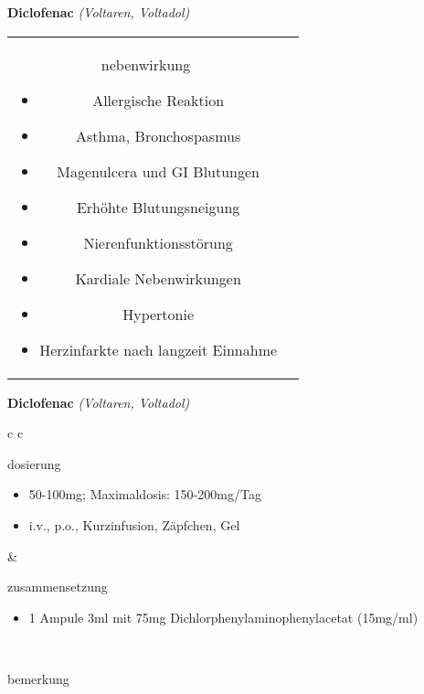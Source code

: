 \begin{frame}{
    \textbf{Diclofenac}
    \textit{(Voltaren, Voltadol)}
}
\begin{tabular}{c c}
\begin{beamercolorbox}[wd=\boxwidth\textwidth,ht=\boxheight\textheight,sep=1em]{nebenwirkung}
            \scriptsize
            \begin{itemize}
                \item Allergische Reaktion
                \item Asthma, Bronchospasmus
                \item Magenulcera und GI Blutungen
                \item Erhöhte Blutungsneigung
                \item Nierenfunktionsstörung
                \item Kardiale Nebenwirkungen
                \item Hypertonie
                \item Herzinfarkte nach langzeit Einnahme
            \end{itemize}
        \end{beamercolorbox} \\
    \end{tabular}
\end{frame}

\begin{frame}{
    \textbf{Diclofenac}
    \textit{(Voltaren, Voltadol)}
}
    \begin{tabular}{c c}
        \begin{beamercolorbox}[wd=\boxwidth\textwidth,ht=\boxheight\textheight,sep=1em]{dosierung}
            \begin{itemize}
                \item 50-100mg; Maximaldosis: 150-200mg/Tag
                \item i.v., p.o., Kurzinfusion, Zäpfchen, Gel	
            \end{itemize}
        \end{beamercolorbox} & 
        \begin{beamercolorbox}[wd=\boxwidth\textwidth,ht=\boxheight\textheight,sep=1em]{zusammensetzung}
            \begin{itemize}
                \item 1 Ampule 3ml mit 75mg Dichlorphenylaminophenylacetat (15mg/ml)
            \end{itemize}
        \end{beamercolorbox} \\
        \begin{beamercolorbox}[wd=\textwidth,ht=\boxheight\textheight,sep=1em]{bemerkung}
        \end{beamercolorbox} \\
    \end{tabular}
\end{frame}

